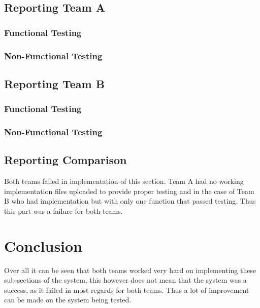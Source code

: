 \documentclass[12pt, oneside]{article}
\begin{document}
	\subsection{Reporting Team A}	
		\subsubsection{Functional Testing}
			
		\subsubsection{Non-Functional Testing }
			
	
	\subsection{Reporting Team B}	
		\subsubsection{Functional Testing}
			
		\subsubsection{Non-Functional Testing }
			
	
	\subsection{Reporting Comparison}
	Both teams failed in implementation of this section. Team A had no working implementation files uploaded to provide proper testing and in the case of Team B who had implementation but with only one function that passed testing. Thus this part was a failure for both teams.
	
\section{Conclusion}
Over all it can be seen that both teams worked very hard on implementing these sub-sections of the system, this however does not mean that the system was a success, as it failed in most regards for both teams. Thus a lot of improvement can be made on the system being tested.
\end{document}
